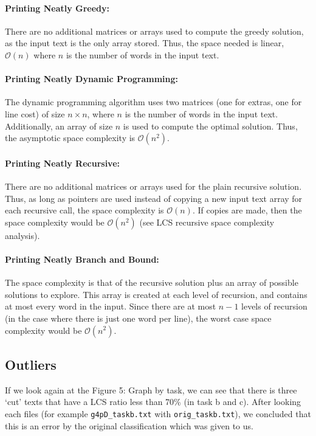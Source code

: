 \documentclass[a4paper,12pt]{article}
\newcommand{\bigO}{\mathcal{O}}
\begin{document}
			\paragraph{Printing Neatly Greedy:} There are no additional matrices or arrays used to compute the greedy solution, as the input text is the only array stored. Thus, the space needed is linear, $\bigO(n)$ where $n$ is the number of words in the input text.

			\paragraph{Printing Neatly Dynamic Programming:} The dynamic programming algorithm uses two matrices (one for extras, one for line cost) of size $n \times n$, where $n$ is the number of words in the input text. Additionally, an array of size $n$ is used to compute the optimal solution. Thus, the asymptotic space complexity is $\bigO(n^2)$.

			\paragraph{Printing Neatly Recursive:} There are no additional matrices or arrays used for the plain recursive solution. Thus, as long as pointers are used instead of copying a new input text array for each recursive call, the space complexity is $\bigO(n)$. If copies are made, then the space complexity would be $\bigO(n^2)$ (see LCS recursive space complexity analysis).

			\paragraph{Printing Neatly Branch and Bound:} The space complexity is that of the recursive solution plus an array of possible solutions to explore. This array is created at each level of recursion, and contains at most every word in the input. Since there are at most $n-1$ levels of recursion (in the case where there is just one word per line), the worst case space complexity would be $\bigO(n^2)$.

		\subsection{Outliers}
			If we look again at the Figure 5: Graph by task, we can see that there is three `cut' texts that have a LCS ratio less than 70\% (in task b and c). After looking each files (for example \texttt{g4pD\_taskb.txt} with \texttt{orig\_taskb.txt}), we concluded that this is an error by the original classification which was given to us.
\end{document}
